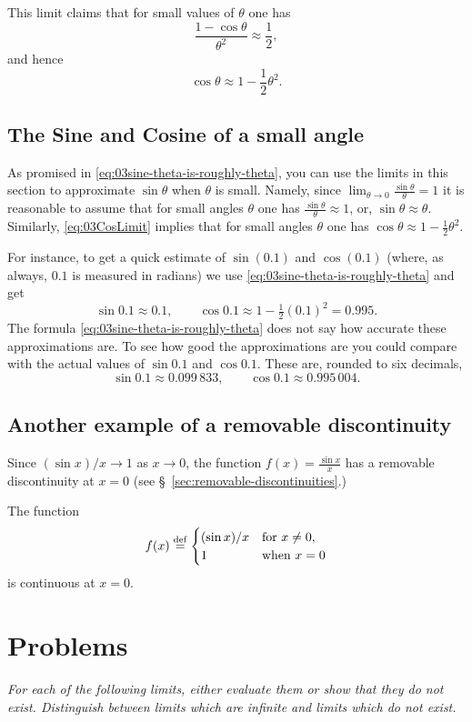 This limit claims that for small values of $\theta$ one has
\[
\frac{1-\cos\theta}{\theta^2} \approx \frac{1}{2},
\]
and hence
\[
\cos \theta \approx 1 - \frac{1}{2}\theta^2.
\]


\subsection{The Sine and Cosine of a small angle} 
As promised in  \eqref{eq:03sine-theta-is-roughly-theta}, you can use
the limits in this section to approximate $\sin\theta$ when $\theta$
is small.  Namely, since $\lim_{\theta\to0}\frac{\sin\theta}{\theta} = 1$ it is
reasonable to assume that for small angles $\theta$ one has
$\frac{\sin\theta}{\theta}\approx 1$, or, $\sin\theta \approx \theta$.
Similarly, \eqref{eq:03CosLimit} implies that for small angles
$\theta$ one has $\cos\theta \approx 1 - \frac12\theta^2$.

For instance, to get a quick estimate of $\sin(0.1)$ and $\cos(0.1)$
(where, as always, $0.1$ is measured in radians)
we use \eqref{eq:03sine-theta-is-roughly-theta} and get
\[
\sin 0.1 \approx 0.1, \qquad
\cos 0.1 \approx 1-\tfrac12(0.1)^2 = 0.995.
\]
The formula \eqref{eq:03sine-theta-is-roughly-theta} does not say how
accurate these approximations are.  To see how good the approximations
are you could compare with the actual values of $\sin 0.1$ and $\cos
0.1$.  These are, rounded to six decimals,
\[
\sin 0.1 \approx 0.099\,833,\qquad
\cos 0.1 \approx 0.995\,004.
\]

\subsection{Another example of a removable discontinuity} 
\label{sec:another-example-of-removable-discontinuity}
Since $(\sin x) /x\to1$ as $x\to0$, the function $f(x) = \frac{\sin x}
{x}$ has a removable discontinuity at $x=0$ (see
\S~\ref{sec:removable-discontinuities}.)

\centerline{}

\noindent%
The function
\[
f(x) \stackrel{\rm def}=
\begin{cases}
  (\sin x)/x & \text{for }x\neq0,\\
  1 & \text{when }x=0
\end{cases}
\]
is continuous at $x=0$.

\section{Problems} 
\problemfont 
\noindent\itshape
For each of the following limits, either evaluate them \emph{or} show that they
do not exist.  Distinguish between limits which are infinite and limits which do
not exist.\upshape

